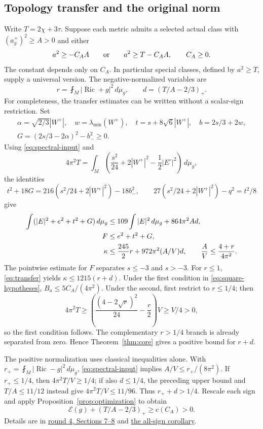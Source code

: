 \documentclass[11pt,a4paper]{article}
\theoremstyle{definition}
\theoremstyle{remark}
\DeclareMathOperator{\Ric}{Ric}
\newcommand{\cE}{\mathcal E}
\newcommand{\dd}{\,d\mu_g}
\newcommand{\avg}[1]{\fint_M #1\dd}
\newcommand{\roundref}[2]{\href{run:../references/rounds/#1}{#2}}
\numberwithin{equation}{section}
\begin{document}
\subsection{Topology transfer and the original norm}\label{sub:topology-transfer}
Write $T=2\chi+3\tau$. Suppose each metric admits a selected actual class
with $(a_g^+)^2\ge A>0$ and either
\begin{equation}\label{eq:square-hypotheses}
 a^2\ge-C_AA\qquad\hbox{or}\qquad a^2\ge T-C_AA,
 \qquad C_A\ge0.
\end{equation}
The constant depends only on $C_A$. In particular special classes,
defined by $a^2\ge T$, supply a universal version. The negative-normalized
variables are
\[
 r=\avg{|\Ric+g|^2},\qquad d=(T/A-2/3)_+.
\]
For completeness, the transfer estimates can be written without a
scalar-sign restriction. Set
\begin{gather*}
 \alpha=\sqrt{2/3}|W^+|,\quad w=\lambda_{\min}(W^+),\quad
 t=s+8\sqrt6|W^+|,\quad b=2s/3+2w,\\
 G=(2s/3-2\alpha)^2-b_-^2\ge0.
\end{gather*}
Using \eqref{eq:spectral-input} and
\begin{equation}\label{eq:T-budget}
 4\pi^2T=\int_M\left(\frac{s^2}{24}+2|W^+|^2-
                                      \frac12|E^\circ|^2\right)\dd,
\end{equation}
the identities
\[
 t^2+18G=216(s^2/24+2|W^+|^2)-18b_-^2,
 \qquad27(s^2/24+2|W^+|^2)-q^2=t^2/8
\]
give
\begin{align}
 \int(|E|^2+e^2+t^2+G)\dd
       &\le109\int|E|^2\dd+864\pi^2Ad,\notag\\
 F&\le e^2+t^2+G,\notag\\
 \kappa&\le\frac{245}{2}r+972\pi^2(A/V)d,
 \qquad \frac AV\le\frac{4+r}{4\pi^2}.\label{eq:transfer}
\end{align}
The pointwise estimate for $F$ separates $s\le-3$ and $s>-3$.
For $r\le1$, \eqref{eq:transfer} yields
$\kappa\le1215(r+d)$. Under the first condition in
\eqref{eq:square-hypotheses}, $B_a\le5C_A/(4\pi^2)$. Under the second,
first restrict to $r\le1/4$; then
\[
 4\pi^2T\ge\left(\frac{(4-2\sqrt r)^2}{24}-\frac r2\right)V
                      \ge V/4>0,
\]
so the first condition follows. The complementary $r>1/4$ branch is
already separated from zero. Hence Theorem~\ref{thm:core} gives a
positive bound for $r+d$.

The positive normalization uses classical inequalities alone. With
$r_+=\avg{|\Ric-g|^2}$, \eqref{eq:spectral-input} implies
$A/V\le r_+/(8\pi^2)$. If $r_+\le1/4$, then
$4\pi^2T/V\ge1/4$; if also $d\le1/4$, the preceding upper bound and
$T/A\le11/12$ instead give $4\pi^2T/V\le11/96$.
Thus $r_++d>1/4$. Rescale each sign and apply
Proposition~\ref{prop:optimization} to obtain
\begin{equation}\label{eq:general-gap}
                  \cE(g)+(T/A-2/3)_+\ge c(C_A)>0.
\end{equation}
Details are in \roundref{round4_rigidity.md}{round 4, Sections 7--8}
and \roundref{round4_all_sign_gap.md}{the all-sign corollary}.
\end{document}
